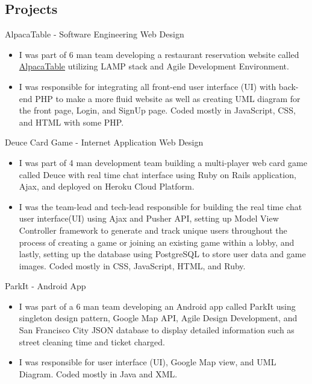 \documentclass[letter]{res}
\begin{document}
\begin{resume}
\section{Projects}
\vspace{1mm}
AlpacaTable - Software Engineering Web Design\vspace{1mm}
\begin{itemize}
 \item I was part of 6 man team developing a restaurant reservation website called \href{ http://www.sfsuswe.com/~f15g07/index.php}{AlpacaTable} utilizing LAMP stack and Agile Development Environment.
\item I was responsible for integrating all front-end user interface (UI) with back-end PHP to make a more fluid website as well as creating UML diagram for the front page, Login, and SignUp page. Coded mostly in JavaScript, CSS, and HTML with some PHP.
\vspace{1.5mm}
 \end{itemize}
Deuce Card Game - Internet Application Web Design\vspace{1mm}
\begin{itemize}
 \item I was part of 4 man development team building a multi-player web card game called Deuce with real time chat interface using Ruby on Rails application, Ajax, and deployed on Heroku Cloud Platform.
 \item  I was the team-lead and tech-lead responsible for building the real time chat user interface(UI) using Ajax and Pusher API, setting up Model View Controller framework to generate and track unique users throughout the process of creating a game or joining an existing game within a lobby, and lastly, setting up the database using PostgreSQL to store user data and game images. Coded mostly in CSS, JavaScript, HTML, and Ruby.
 \vspace{1.5mm}
 \end{itemize}
 ParkIt - Android App \vspace{1mm}
\begin{itemize}
 \item I was part of a 6 man team developing an Android app called ParkIt using singleton design pattern, Google Map API, Agile Design Development, and San Francisco City JSON database to display detailed information such as street cleaning time and ticket charged.
 \item I was responsible for user interface (UI), Google Map view, and UML Diagram. Coded mostly in Java and XML.
 \vspace{1.5mm}
 \end{itemize}

\end{resume}
\end{document}
